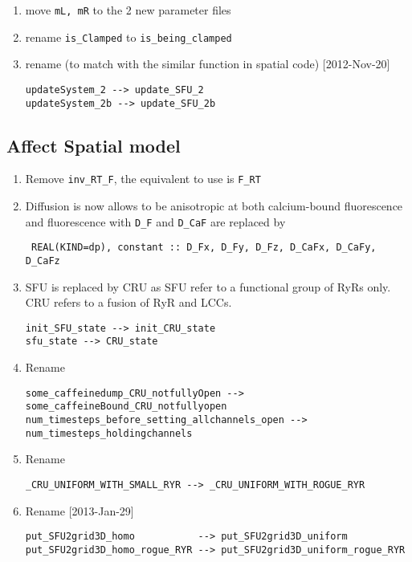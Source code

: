 \begin{enumerate}
\item move \verb!mL, mR! to the 2 new parameter files

\item rename \verb!is_Clamped! to \verb!is_being_clamped!

\item rename (to match with the similar function in spatial code) [2012-Nov-20]
\begin{verbatim}
updateSystem_2 --> update_SFU_2
updateSystem_2b --> update_SFU_2b
\end{verbatim}
\end{enumerate}

\subsection{Affect Spatial model}
\label{sec:affect-spatial-model}

\begin{enumerate}
\item Remove \verb!inv_RT_F!, the equivalent to use is \verb!F_RT!
\item Diffusion is now allows to be anisotropic at both calcium-bound
fluorescence and fluorescence with \verb!D_F! and \verb!D_CaF! are replaced by 
\begin{verbatim}
 REAL(KIND=dp), constant :: D_Fx, D_Fy, D_Fz, D_CaFx, D_CaFy, D_CaFz
\end{verbatim}

\item SFU is replaced by CRU as SFU refer to a functional group of RyRs only.
CRU refers to a fusion of RyR and LCCs. 
\begin{verbatim}
init_SFU_state --> init_CRU_state
sfu_state --> CRU_state
\end{verbatim}

\item Rename
\begin{verbatim}
some_caffeinedump_CRU_notfullyOpen --> some_caffeineBound_CRU_notfullyopen
num_timesteps_before_setting_allchannels_open --> num_timesteps_holdingchannels
\end{verbatim}

\item Rename 
\begin{verbatim}
_CRU_UNIFORM_WITH_SMALL_RYR --> _CRU_UNIFORM_WITH_ROGUE_RYR
\end{verbatim}

\item Rename [2013-Jan-29]
\begin{verbatim}
put_SFU2grid3D_homo           --> put_SFU2grid3D_uniform
put_SFU2grid3D_homo_rogue_RYR --> put_SFU2grid3D_uniform_rogue_RYR
\end{verbatim}
\end{enumerate}

